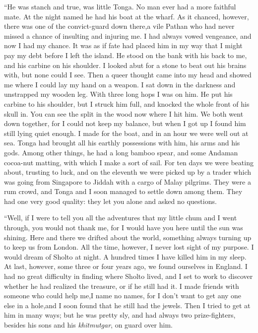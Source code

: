 \documentclass[12pt,english,oneside]{book}
\begin{document}
{}``He was stanch and true, was little Tonga. No man ever had a more
faithful mate. At the night named he had his boat at the wharf. As
it chanced, however, there was one of the convict-guard down there,\mdsh{---}a
vile Pathan who had never missed a chance of insulting and injuring
me. I had always vowed vengeance, and now I had my chance. It was
as if fate had placed him in my way that I might pay my debt before
I left the island. He stood on the bank with his back to me, and his
carbine on his shoulder. I looked abut for a stone to beat out his
brains with, but none could I see. Then a queer thought came into
my head and showed me where I could lay my hand on a weapon. I sat
down in the darkness and unstrapped my wooden leg. With three long
hops I was on him. He put his carbine to his shoulder, but I struck
him full, and knocked the whole front of his skull in. You can see
the split in the wood now where I hit him. We both went down together,
for I could not keep my balance, but when I got up I found him still
lying quiet enough. I made for the boat, and in an hour we were well
out at sea. Tonga had brought all his earthly possessions with him,
his arms and his gods. Among other things, he had a long bamboo spear,
and some Andaman cocoa-nut matting, with which I make a sort of sail.
For ten days we were beating about, trusting to luck, and on the eleventh
we were picked up by a trader which was going from Singapore to Jiddah
with a cargo of Malay pilgrims. They were a rum crowd, and Tonga and
I soon managed to settle down among them. They had one very good quality:
they let you alone and asked no questions.

{}``Well, if I were to tell you all the adventures that my little
chum and I went through, you would not thank me, for I would have
you here until the sun was shining. Here and there we drifted about
the world, something always turning up to keep us from London. All
the time, however, I never lost sight of my purpose. I would dream
of Sholto at night. A hundred times I have killed him in my sleep.
At last, however, some three or four years ago, we found ourselves
in England. I had no great difficulty in finding where Sholto lived,
and I set to work to discover whether he had realized the treasure,
or if he still had it. I made friends with someone who could help
me,\mdsh{---}I name no names, for I don't want to get any one else
in a hole,\mdsh{---}and I soon found that he still had the jewels.
Then I tried to get at him in many ways; but he was pretty sly, and
had always two prize-fighters, besides his sons and his \emph{khitmutgar},
on guard over him.
\end{document}
